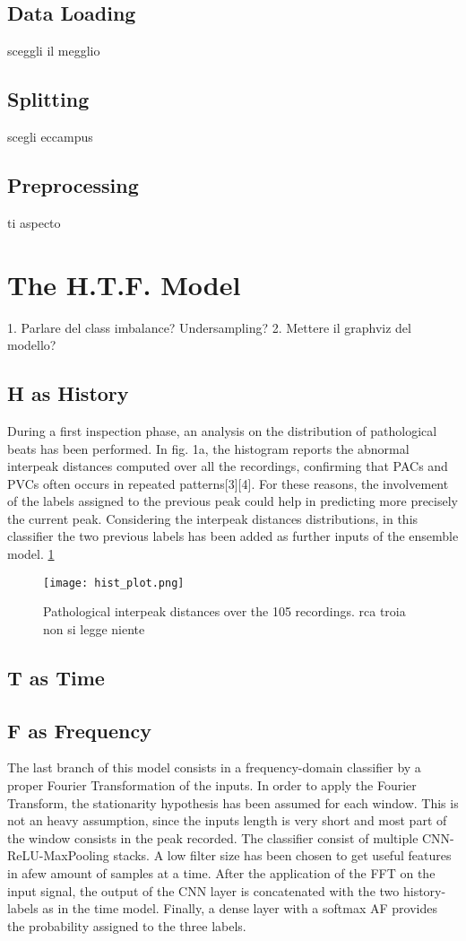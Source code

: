 \documentclass[conference]{IEEEtran}
\begin{document}
\subsection{Data Loading}
    sceggli il megglio
\subsection{Splitting}
    scegli eccampus
\subsection{Preprocessing}
    ti aspecto
\section{The H.T.F. Model}
1. Parlare del class imbalance? Undersampling? 
2. Mettere il graphviz del modello? 
\subsection{H as History}
During a first inspection phase, an analysis on the distribution of pathological beats has been performed. 
In fig. 1a, the histogram reports the abnormal interpeak distances computed over all the recordings, confirming that 
PACs and PVCs often occurs in repeated patterns[3][4]. For these reasons, the involvement of the labels assigned to 
the previous peak could help in predicting more precisely the current peak. Considering the interpeak distances distributions, 
in this classifier the two previous labels has been added as further inputs of the ensemble model.
\ref{fig:graphs}
\begin{figure}[]
    \texttt{[image: hist\_plot.png]}
    \caption{Pathological interpeak distances over the 105 recordings. rca troia non si legge niente }
    \label{fig:graphs}
\end{figure}
\subsection{T as Time}
\subsection{F as Frequency}
The last branch of this model consists in a frequency-domain classifier by a proper Fourier Transformation of the inputs.
In order to apply the Fourier Transform, the stationarity hypothesis has been assumed for each window. This is not an heavy assumption, since
the inputs length is very short and most part of the window consists in the peak recorded. 
The classifier consist of multiple CNN-ReLU-MaxPooling stacks. A low filter size has been chosen to get useful features in afew amount of samples at a time.
After the application of the FFT on the input signal, the output of the CNN layer is concatenated with the two history-labels as in the time model. 
Finally, a dense layer with a softmax AF provides the probability assigned to the three labels. 
\end{document}
